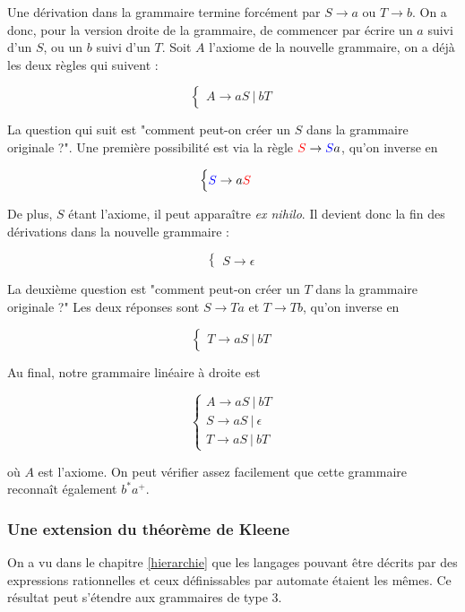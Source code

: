 \begin{correction*}
Une dérivation dans la grammaire termine forcément par $S \rightarrow a$ ou $T \rightarrow b$. On a donc, pour la version droite de la grammaire, de commencer par écrire un $a$ suivi d'un $S$, ou un $b$ suivi d'un $T$. Soit $A$ l'axiome de la nouvelle grammaire, on a déjà les deux règles qui suivent :

\[
\begin{cases}
A \rightarrow aS~|~bT
\end{cases}
\]

La question qui suit est "comment peut-on créer un $S$ dans la grammaire originale ?". Une première possibilité est via la règle $\textcolor{red}{S} \rightarrow \textcolor{blue}{S}a$, qu'on inverse en 

\[
\begin{cases}
\textcolor{blue}{S} \rightarrow a\textcolor{red}{S}
\end{cases}
\]

De plus, $S$ étant l'axiome, il peut apparaître \textit{ex nihilo}. Il devient donc la fin des dérivations dans la nouvelle grammaire : 

\[
\begin{cases}
S \rightarrow \epsilon
\end{cases}
\]

La deuxième question est "comment peut-on créer un $T$ dans la grammaire originale ?" Les deux réponses sont $S \rightarrow Ta$ et $T \rightarrow Tb$, qu'on inverse en 


\[
\begin{cases}
T \rightarrow aS~|~bT
\end{cases}
\]

Au final, notre grammaire linéaire à droite est 

\[
\begin{cases}
A \rightarrow aS~|~bT \\
S \rightarrow aS~|~\epsilon \\
T \rightarrow aS~|~bT
\end{cases}
\]

où $A$ est l'axiome. On peut vérifier assez facilement que cette grammaire reconnaît également $b^*a^+$.

\end{correction*}


\subsubsection{Une extension du théorème de Kleene}
On a vu dans le chapitre \ref{hierarchie} que les langages pouvant être décrits par des expressions rationnelles et ceux définissables par automate étaient les mêmes. Ce résultat peut s'étendre aux grammaires de type 3.

